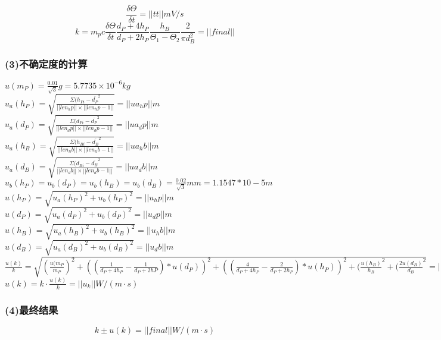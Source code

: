$$\frac{\delta\Theta}{\delta t} = ||tt||mV/s$$
$$k = m_pc\frac{\delta\Theta}{\delta t}\frac{d_P+4h_P}{d_P+2h_P}\frac{h_B}{\Theta_1-\Theta_2}\frac{2}{\pi d_B^2} = ||final||$$

\subsubsection*{(3)不确定度的计算}
\noindent
$\displaystyle u(m_P) = \frac{0.01}{\sqrt3}g = 5.7735\times 10^{-6}kg$ \\

$\displaystyle u_a(h_P) = \sqrt{\frac{\Sigma(h_{Pi} - \overline{d_P}^2}{ ||len_hp|| \times ||len_hp - 1|| } } = ||ua_hp||m$ \\
$\displaystyle u_a(d_P) = \sqrt{\frac{\Sigma(d_{Pi} - \overline{d_P}^2}{ ||len_dp|| \times ||len_dp - 1|| } } = ||ua_dp||m$ \\
$\displaystyle u_a(h_B) = \sqrt{\frac{\Sigma(h_{Bi} - \overline{d_B}^2}{ ||len_hb|| \times ||len_hb - 1|| } } = ||ua_hb||m$ \\
$\displaystyle u_a(d_B) = \sqrt{\frac{\Sigma(d_{Bi} - \overline{d_B}^2}{ ||len_db|| \times ||len_db - 1|| } } = ||ua_db||m$ \\
$\displaystyle u_b(h_P) = u_b(d_P) = u_b(h_B) = u_b(d_B) = \frac{0.02}{\sqrt 3}mm = 1.1547*10-5m$ \\

$\displaystyle u(h_P) = \sqrt{u_a(h_P)^2 + u_b(h_P)^2} = ||u_hp||m$ \\
$\displaystyle u(d_P) = \sqrt{u_a(d_P)^2 + u_b(d_P)^2} = ||u_dp||m$ \\
$\displaystyle u(h_B) = \sqrt{u_a(h_B)^2 + u_b(h_B)^2} = ||u_hb||m$ \\
$\displaystyle u(d_B) = \sqrt{u_a(d_B)^2 + u_b(d_B)^2} = ||u_db||m$ \\

$\displaystyle \frac{u(k)}{k} = \sqrt{(\frac{u(m_P}{m_P})^2 + ((\frac{1}{d_P + 4h_P} - \frac{1}{d_P + 2hP}) * u(d_P))^2 + ((\frac{4}{d_P + 4h_P} - \frac{2}{d_P + 2h_P}) * u(h_P))^2 + (\frac{u(h_B)}{h_B}^2 + (\frac{2u(d_B)}{d_B}^2} = ||u_k_k||$ \\

$\displaystyle u(k) = k\cdot\frac{u(k)}{k} = ||u_k||W/(m\cdot s)$ \\


\subsubsection*{(4)最终结果}
\noindent
$$k \pm u(k) = ||final|| W/(m\cdot s)$$
